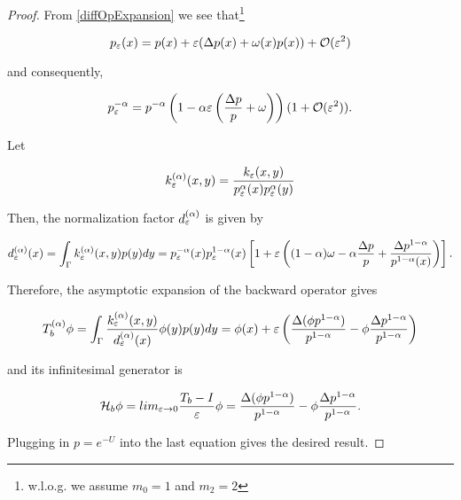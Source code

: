 \begin{proof}
From \ref{diffOpExpansion} we see that\footnote{w.l.o.g. we assume $m_0=1$ and $m_2=2$} 

\begin{equation*}
p_\varepsilon(x)=p(x)+\varepsilon (\Delta p(x)+ \omega(x)p(x))+\mathcal{O}(\varepsilon^2)
\end{equation*}

and consequently,

\begin{equation*}
p_\varepsilon^{-\alpha}=p^{-\alpha}\left(1-\alpha\varepsilon \left(\frac{\Delta p}{p}+\omega \right) \right)(1+\mathcal{O}(\varepsilon^2)).
\end{equation*}

Let

\begin{equation*}
k_\varepsilon^{(\alpha)}(x,y)=\frac{k_\varepsilon(x,y)}{p_\varepsilon^{\alpha}(x)p_\varepsilon^{\alpha}(y)}
\end{equation*}

Then, the normalization factor $d_\varepsilon^{(\alpha)}$ is given by

\begin{equation*}
d_\varepsilon^{(\alpha)}(x)=\int_\Gamma k_\varepsilon^{(\alpha)}(x,y)p(y)dy = 
p_\varepsilon^{-\alpha}(x)p_\varepsilon^{1-\alpha}(x)\left[1+\varepsilon \left((1-\alpha)\omega - \alpha\frac{\Delta p}{p}+\frac{\Delta p^{1-\alpha}}{p^{1-\alpha}(x)} \right) \right].
\end{equation*}

Therefore, the asymptotic expansion of the backward operator gives

\begin{equation*}
T_b^{(\alpha)}\phi = \int_\Gamma \frac{k_\varepsilon^{(\alpha)}(x,y)}{d_\varepsilon^{(\alpha)}(x)}\phi(y)p(y)dy = \phi(x) + \varepsilon\left(\frac{\Delta(\phi p^{1-\alpha})}{p^{1-\alpha}}-\phi \frac{\Delta p^{1-\alpha}}{p^{1-\alpha}} \right)
\end{equation*}

and its infinitesimal generator is 

\begin{equation*}
\mathcal{H}_b\phi =
lim_{\varepsilon\rightarrow 0}\frac{T_b-I}{\varepsilon}\phi =
\frac{\Delta(\phi p^{1-\alpha})}{p^{1-\alpha}}-\phi \frac{\Delta p^{1-\alpha}}{p^{1-\alpha}}.
\end{equation*}

Plugging in $p=e^{-U}$ into the last equation gives the desired result.
\end{proof}
























